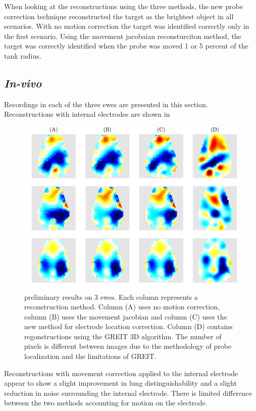 When looking at the reconstructions using the three methods, the new probe correction technique
reconstructed the target as the brightest object in all scenarios. With no motion correction the 
target was identified correctly only in the first scenario. Using the movement jacobaian 
reconsturciton method, the target was correctly identified when the probe was moved 1 or 5 percent
of the tank radius. 

\subsection{\emph{In-vivo}}
Recordings in each of the three ewes are presented in this section.
Reconstructions with internal electrodes are shown in

\begin{figure}
    \centering
	\includegraphics[width=\textwidth]{chapter7-internal_elec_motion/imgs/lamb_reconstruction_all.pdf} 
	\caption[Results of the probe location correction]{\label{fig:internal_reconstructions} 
	preliminary results on 3 ewes. Each column represents a reconstruction method. Column (A)
	uses no motion correction, column (B) uses the movement jacobian and column (C) uses the new method
	for electrode location correction. Column (D) contains regonstructions using the GREIT 3D algorithm.
	The number of pixels is different between images due to the methodology of probe localization and 
	the limitations of GREIT.}
\end{figure}

Reconstructions with movement correction applied to the internal electrode appear to show a 
slight improvement in lung distinguishability and a slight reduction
in noise surrounding the internal electrode. There is limited difference between the
two methods accounting for motion on the electrode.

